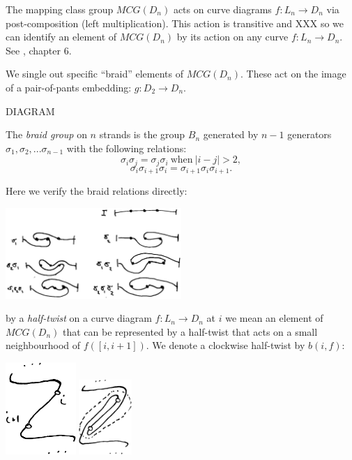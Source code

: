 \documentclass[12pt,a4paper]{article}
\begin{document}


The mapping class group $MCG(D_n)$ acts on curve diagrams $f : L_n\to D_n$
via post-composition (left multiplication).
This action is transitive and XXX so we can identify an element of
$MCG(D_n)$ by its action on any curve $f:L_n\to D_n.$
See \cite{Dehornoy02}, chapter 6.


We single out specific ``braid'' elements of $MCG(D_n)$.
These act on the image of a pair-of-pants embedding: $g:D_2\to D_n.$

DIAGRAM

The {\it braid group} on $n$ strands is the group $B_n$ generated by $n-1$ generators
$\sigma_1, \sigma_2, ... \sigma_{n-1}$ with the following relations:
    $$ \sigma_i \sigma_j = \sigma_j \sigma_i \ \text{when}\ |i-j| > 2, $$
    $$ \sigma_i \sigma_{i+1} \sigma_i =  \sigma_{i+1} \sigma_i \sigma_{i+1}.$$


Here we verify the braid relations directly:

\begin{center}
\includegraphics[width=0.5\textwidth]{curve-braid.eps}
\end{center}


 by a {\it half-twist} on a curve
diagram $f:L_n\to D_n$ at $i$ we mean an element of $MCG(D_n)$
that can be represented by a half-twist that acts
on a small neighbourhood of $f([i, i+1]).$
We denote a clockwise half-twist by $b(i, f):$

\begin{center}
\includegraphics[width=0.2\textwidth]{halftwist-1.eps}
\includegraphics[width=0.15\textwidth]{halftwist-2.eps}
\end{center}
\end{document}
